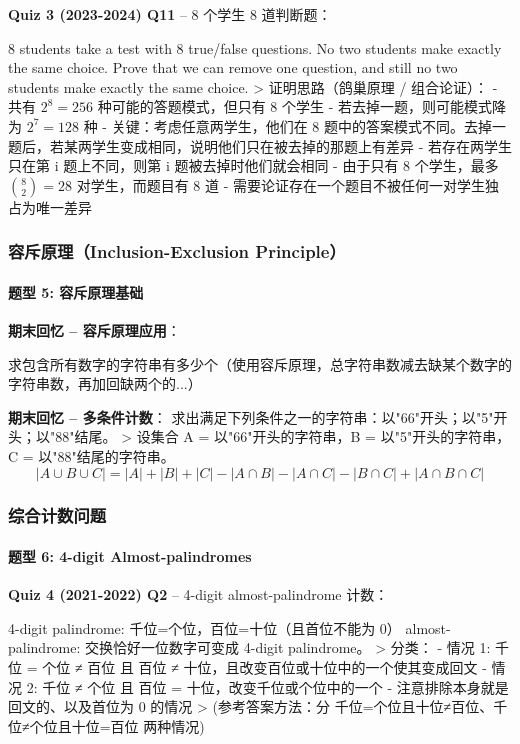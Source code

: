 \documentclass[10pt,a4paper,openany]{ctexbook}
\theoremstyle{definition}
\theoremstyle{remark}
\renewenvironment{quote}
  {\list{}{\leftmargin=1em\rightmargin=0pt\topsep=0.5pt\partopsep=0pt}\item[]}
  {\endlist}
\begin{document}
\textbf{Quiz 3 (2023-2024) Q11} -- 8 个学生 8 道判断题：
\begin{quote}
8 students take a test with 8 true/false questions. No two students make exactly the same choice. Prove that we can remove one question, and still no two students make exactly the same choice.
>
证明思路（鸽巢原理 / 组合论证）：
- 共有 $2^8 = 256$ 种可能的答题模式，但只有 8 个学生
- 若去掉一题，则可能模式降为 $2^7 = 128$ 种
- 关键：考虑任意两学生，他们在 8 题中的答案模式不同。去掉一题后，若某两学生变成相同，说明他们只在被去掉的那题上有差异
- 若存在两学生只在第 i 题上不同，则第 i 题被去掉时他们就会相同
- 由于只有 8 个学生，最多 $\binom{8}{2} = 28$ 对学生，而题目有 8 道
- 需要论证存在一个题目不被任何一对学生独占为唯一差异

\end{quote}

\subsubsection{容斥原理（Inclusion-Exclusion Principle）}

\paragraph{题型 5: 容斥原理基础}

\textbf{期末回忆 -- 容斥原理应用}：
\begin{quote}
求包含所有数字的字符串有多少个（使用容斥原理，总字符串数减去缺某个数字的字符串数，再加回缺两个的...）

\textbf{期末回忆 -- 多条件计数}：
求出满足下列条件之一的字符串：以"66"开头；以"5"开头；以"88"结尾。
>
设集合 A = 以"66"开头的字符串，B = 以"5"开头的字符串，C = 以"88"结尾的字符串。
\[
 |A \cup B \cup C| = |A| + |B| + |C| - |A \cap B| - |A \cap C| - |B \cap C| + |A \cap B \cap C| 
\]


\end{quote}

\subsubsection{综合计数问题}

\paragraph{题型 6: 4-digit Almost-palindromes}

\textbf{Quiz 4 (2021-2022) Q2} -- 4-digit almost-palindrome 计数：
\begin{quote}
4-digit palindrome: 千位=个位，百位=十位（且首位不能为 0）
almost-palindrome: 交换恰好一位数字可变成 4-digit palindrome。
>
分类：
- 情况 1: 千位 = 个位 ≠ 百位  且  百位 ≠ 十位，且改变百位或十位中的一个使其变成回文
- 情况 2: 千位 ≠ 个位  且  百位 = 十位，改变千位或个位中的一个
- 注意排除本身就是回文的、以及首位为 0 的情况
>
(参考答案方法：分 千位=个位且十位≠百位、千位≠个位且十位=百位 两种情况)

\end{quote}
\end{document}
